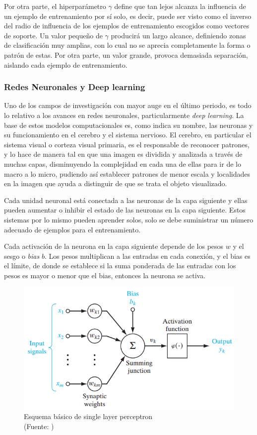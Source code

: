 Por otra parte, el hiperparámetro $\gamma$ define que tan lejos alcanza la influencia de un ejemplo de entrenamiento por sí solo, es decir, puede ser visto como el inverso del radio de influencia de los ejemplos de entrenamiento escogidos como vectores de soporte. Un valor pequeño de $\gamma$ producirá un largo alcance, definiendo zonas de clasificación muy amplias, con lo cual no se aprecia completamente la forma o patrón de estas. Por otra parte, un valor grande, provoca demasiada separación, aislando cada ejemplo de entrenamiento.

\subsubsection{Redes Neuronales y Deep learning}

Uno de los campos de investigación con mayor auge en el último periodo, es todo lo relativo a los avances en redes neuronales, particularmente \textit{deep learning}.  La base de estos modelos computacionales es, como indica su nombre, las neuronas y su funcionamiento en el cerebro y el sistema nervioso. El cerebro, en particular el sistema visual o corteza visual primaria, es el responsable de reconocer patrones, y lo hace de manera tal en que una imagen es dividida y analizada a través de muchas capas, disminuyendo la complejidad en cada una de ellas para ir de lo macro a lo micro, pudiendo así establecer patrones de menor escala y localidades en la imagen que ayuda a distinguir de que se trata el objeto visualizado.

Cada unidad neuronal está conectada a las neuronas de la capa siguiente y ellas pueden aumentar o inhibir el estado de las neuronas en la capa siguiente. Estos sistemas por lo mismo pueden aprender solos, solo se debe suministrar un número adecuado de ejemplos para el entrenamiento.

Cada activación de la neurona en la capa siguiente depende de los pesos $w$ y el sesgo o \textit{bias} $b$. Los pesos multiplican a las entradas en cada conexión, y el bias es el límite, de donde se establece si la suma ponderada de las entradas con los pesos es mayor o menor que el bias, entonces la neurona se activa.

\begin{figure}[ht!]
\centering
\includegraphics[width=.6\textwidth]{figures/SLP.png}
\caption[Esquema básico de single layer perceptron]{Esquema básico de single layer perceptron\\
{\scriptsize (Fuente: \cite{slp})}}
\label{fig:slp}
\end{figure}

